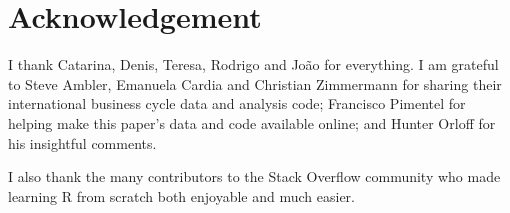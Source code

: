 \section*{Acknowledgement}

I thank Catarina, Denis, Teresa, Rodrigo and Jo\~{a}o for everything. I am grateful to Steve Ambler, Emanuela Cardia and Christian Zimmermann for sharing their international business cycle data and analysis code; Francisco Pimentel for helping make this paper's data and code available online; and Hunter Orloff for his insightful comments.

I also thank the many contributors to the Stack Overflow community who made learning R from scratch both enjoyable and much easier.